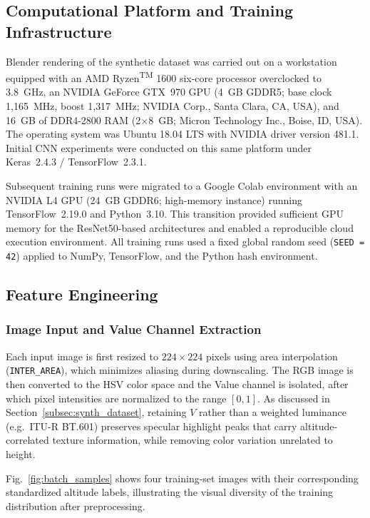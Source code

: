 \subsection{Computational Platform and Training Infrastructure}
\label{subsec:platform}

Blender rendering of the synthetic dataset was carried out on a workstation equipped with an AMD Ryzen\textsuperscript{TM} 1600 six-core processor overclocked to 3.8~GHz, an NVIDIA GeForce GTX~970 GPU (4~GB GDDR5; base clock 1{,}165~MHz, boost 1{,}317~MHz; NVIDIA Corp., Santa Clara, CA, USA), and 16~GB of DDR4-2800 RAM (2$\times$8~GB; Micron Technology Inc., Boise, ID, USA). The operating system was Ubuntu 18.04 LTS with NVIDIA driver version 481.1. Initial CNN experiments were conducted on this same platform under Keras~2.4.3 / TensorFlow~2.3.1.

Subsequent training runs were migrated to a Google Colab environment with an NVIDIA L4 GPU (24~GB GDDR6; high-memory instance) running TensorFlow~2.19.0 and Python~3.10. This transition provided sufficient GPU memory for the ResNet50-based architectures and enabled a reproducible cloud execution environment. All training runs used a fixed global random seed (\texttt{SEED = 42}) applied to NumPy, TensorFlow, and the Python hash environment.

\subsection{Feature Engineering}
\subsubsection{Image Input and Value Channel Extraction}
\label{subsubsec:vchannel}

Each input image is first resized to $224 \times 224$ pixels using area interpolation (\texttt{INTER\_AREA}), which minimizes aliasing during downscaling. The RGB image is then converted to the HSV color space and the Value channel is isolated, after which pixel intensities are normalized to the range $[0, 1]$. As discussed in Section~\ref{subsec:synth_dataset}, retaining $V$ rather than a weighted luminance (e.g.\ ITU-R BT.601) preserves specular highlight peaks that carry altitude-correlated texture information, while removing color variation unrelated to height.

Fig.~\ref{fig:batch_samples} shows four training-set images with their corresponding standardized altitude labels, illustrating the visual diversity of the training distribution after preprocessing.

